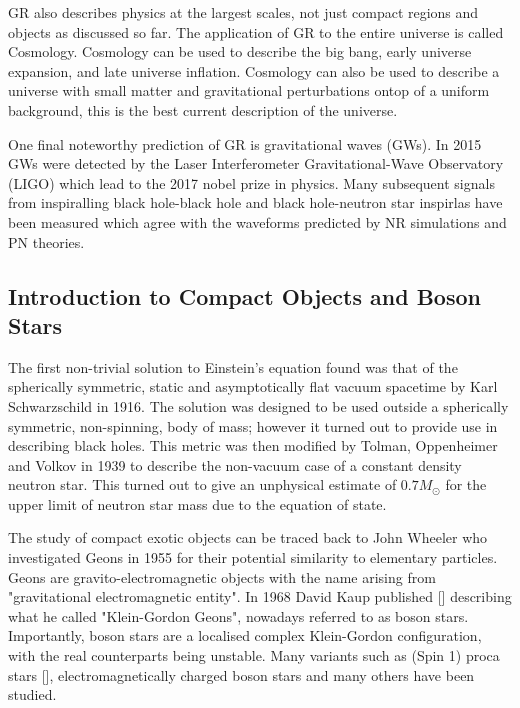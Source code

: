 GR also describes physics at the largest scales, not just compact regions and objects as discussed so far. The application of GR to the entire universe is called Cosmology. Cosmology can be used to describe the big bang, early universe expansion, and late universe inflation. Cosmology can also be used to describe a universe with small matter and gravitational perturbations ontop of a uniform background, this is the best current description of the universe.

One final noteworthy prediction of GR is gravitational waves (GWs). In 2015 GWs were detected by the Laser Interferometer Gravitational-Wave Observatory (LIGO) which lead to the 2017 nobel prize in physics. Many subsequent signals from inspiralling black hole-black hole and black hole-neutron star inspirlas have been measured which agree with the waveforms predicted by NR simulations and PN theories. 

\subsection{Introduction to Compact Objects and Boson Stars}
The first non-trivial solution to Einstein's equation found was that of the spherically symmetric, static and asymptotically flat vacuum spacetime by Karl Schwarzschild in 1916. The solution was designed to be used outside a spherically symmetric, non-spinning, body of mass; however it turned out to provide use in describing black holes. This metric was then modified by Tolman, Oppenheimer and Volkov in 1939 to describe the non-vacuum case of a constant density neutron star. This turned out to give an unphysical estimate of $0.7 M_\odot$ for the upper limit of neutron star mass due to the equation of state. 

The study of compact exotic objects can be traced back to John Wheeler who investigated Geons in 1955 for their potential similarity to elementary particles. Geons are gravito-electromagnetic objects with the name arising from "gravitational electromagnetic entity". In 1968 David Kaup published [] describing what he called "Klein-Gordon Geons", nowadays referred to as boson stars. Importantly, boson stars are a localised complex Klein-Gordon configuration, with the real counterparts being unstable. Many variants such as (Spin 1) proca stars [], electromagnetically charged boson stars and many others have been studied. 

